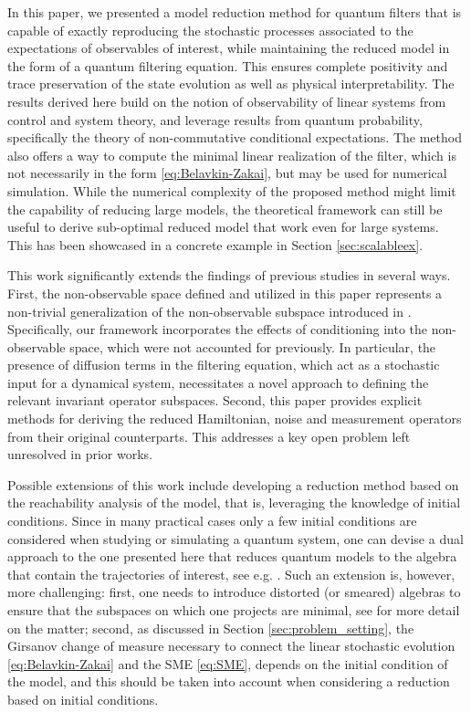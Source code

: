 \documentclass[aihp,12pt]{imsart}
\begin{document}
In this paper, we presented a model reduction method for quantum filters that is capable of exactly reproducing the stochastic processes associated to the expectations of observables of interest, while maintaining the reduced model in the form of a quantum filtering equation. This ensures complete positivity and trace preservation of the state evolution as well as physical interpretability. The results derived here build on the notion of observability of linear systems from control and system theory, and leverage results from quantum probability, specifically the theory of non-commutative conditional expectations. The method also offers a way to compute the minimal linear realization of the filter, which is not necessarily in the form \eqref{eq:Belavkin-Zakai}, but may be used for numerical simulation.
While the numerical complexity of the proposed method might limit the capability of reducing large models, the theoretical framework can still be useful to derive sub-optimal reduced model that work even for large systems. This has been showcased in a concrete example in Section \ref{sec:scalableex}.

This work significantly extends the findings of previous studies \cite{tit2023,prxq2024,letter2024} in several ways. First, the non-observable space defined and utilized in this paper represents a non-trivial generalization of the non-observable subspace introduced in \cite{prxq2024}. Specifically, our framework incorporates the effects of conditioning into the non-observable space, which were not accounted for previously. In particular, the presence of diffusion terms in the filtering equation, which act as a stochastic input for a dynamical system, necessitates a novel approach to defining the relevant invariant operator subspaces.
Second, this paper provides explicit methods for deriving the reduced Hamiltonian, noise and measurement operators from their original counterparts. This addresses a key open problem left unresolved in prior works.

Possible extensions of this work include developing a reduction method based on the reachability analysis of the model, that is, leveraging the knowledge of initial conditions. Since in many practical cases only a few initial conditions are considered when studying or simulating a quantum system, one can devise a dual approach to the one presented here that reduces quantum models to the algebra that contain the trajectories of interest, see e.g. \cite{prxq2024,tit2023}. Such an extension is, however, more challenging: first, one needs to introduce distorted (or smeared) algebras to ensure that the subspaces on which one projects are minimal, see \cite{tit2023} for more detail on the matter; second, as discussed in Section \ref{sec:problem_setting}, the Girsanov change of measure necessary to connect the linear stochastic evolution \eqref{eq:Belavkin-Zakai} and the SME \eqref{eq:SME}, depends on the initial condition of the model, and this should be taken into account when considering a reduction based on initial conditions. 
\end{document}

